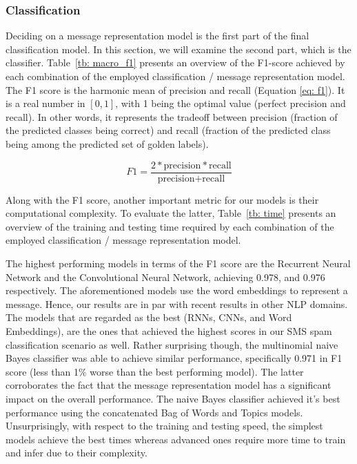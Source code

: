 \documentclass[letterpaper]{article}
\begin{document}
\subsubsection{Classification}  \label{Classification Results}

Deciding on a message representation model is the first part of the final classification model. In this section, we will examine the second part, which is the classifier. Table~\ref{tb: macro_f1} presents an overview of the F1-score achieved by each combination of the employed classification / message representation model. The F1 score is the harmonic mean of precision and recall (Equation \ref{eq: f1}). It is a real number in $[0, 1]$, with 1 being the optimal value (perfect precision and recall). In other words, it represents the tradeoff between precision (fraction of the predicted classes being correct) and recall (fraction of the predicted class being among the predicted set of golden labels).

\begin{equation} \label{eq: f1}
	F1 = \frac{2 * \text{precision} * \text{recall}}{\text{precision} + \text{recall}}
\end{equation}

Along with the F1 score, another important metric for our models is their computational complexity. To evaluate the latter, Table~\ref{tb: time} presents an overview of the training and testing time required by each combination of the employed classification / message representation model.

The highest performing models in terms of the F1 score are the Recurrent Neural Network and the Convolutional Neural Network, achieving 0.978, and 0.976 respectively. The aforementioned models use the word embeddings to represent a message. Hence, our results are in par with recent results in other NLP domains. The models that are regarded as the best (RNNs, CNNs, and Word Embeddings), are the ones that achieved the highest scores in our SMS spam classification scenario as well. Rather surprising though, the multinomial naive Bayes classifier was able to achieve similar performance, specifically 0.971 in F1 score (less than 1\% worse than the best performing model). The latter corroborates the fact that the message representation model has a significant impact on the overall performance. The naive Bayes classifier achieved it's best performance using the concatenated Bag of Words and Topics models. Unsurprisingly, with respect to the training and testing speed, the simplest models achieve the best times whereas advanced ones require more time to train and infer due to their complexity.
\end{document}
